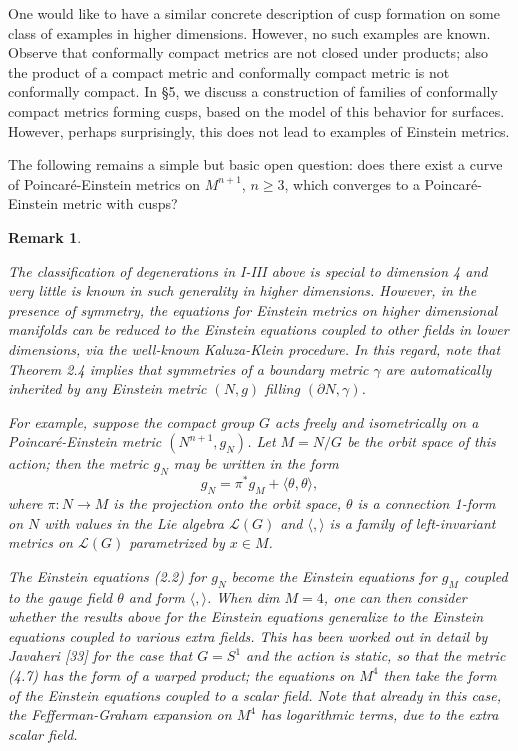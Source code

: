 \documentclass[11pt,amsfonts]{amsart}
\newtheorem{remark}[theorem]{Remark}
\begin{document}
\medskip

 One would like to have a similar concrete description of cusp formation 
on some class of examples in higher dimensions. However, no such examples 
are known. Observe that conformally compact metrics are not closed under 
products; also the product of a compact metric and conformally compact 
metric is not conformally compact. In \S 5, we discuss a construction of 
families of conformally compact metrics forming cusps, based on the model 
of this behavior for surfaces. However, perhaps surprisingly, this does not 
lead to examples of Einstein metrics. 

 The following remains a simple but basic open question: does there 
exist a curve of Poincar\'e-Einstein metrics on $M^{n+1}$, $n \geq 3$, 
which converges to a Poincar\'e-Einstein metric with cusps? 

\begin{remark} \label{r4.4}
{\rm The classification of degenerations in I-III above is special to 
dimension 4 and very little is known in such generality in higher 
dimensions. However, in the presence of symmetry, the equations for 
Einstein metrics on higher dimensional manifolds can be reduced to 
the Einstein equations coupled to other fields in lower dimensions, via 
the well-known Kaluza-Klein procedure. In this regard, note that 
Theorem 2.4  implies that symmetries of a boundary metric $\gamma$ 
are automatically inherited by any Einstein metric $(N, g)$ filling 
$(\partial N, \gamma)$. 

  For example, suppose the compact group $G$ acts freely and isometrically 
on a Poincar\'e-Einstein metric $(N^{n+1}, g_{N})$. Let $M = N / G$ be the 
orbit space of this action; then the metric $g_{N}$ may be written in the 
form 
\begin{equation} \label{e4.7}
g_{N} = \pi^{*}g_{M} + \langle \theta, \theta \rangle,
\end{equation}
where $\pi: N \rightarrow M$ is the projection onto the orbit space, 
$\theta$ is a connection 1-form on $N$ with values in the Lie algebra 
${\mathcal L}(G)$ and $\langle, \rangle$ is a family of left-invariant 
metrics on ${\mathcal L}(G)$ parametrized by $x \in M$. 

   The Einstein equations (2.2) for $g_{N}$ become the Einstein equations 
for $g_{M}$ coupled to the gauge field $\theta$ and form $\langle, \rangle$. 
When dim $M = 4$, one can then consider whether the results above for the 
Einstein equations generalize to the Einstein equations coupled to 
various extra fields. This has been worked out in detail by Javaheri 
[33] for the case that $G = S^{1}$ and the action is static, so that 
the metric (4.7) has the form of a warped product; the equations on $M^{4}$ 
then take the form of the Einstein equations coupled to a scalar field. Note 
that already in this case, the Fefferman-Graham expansion on $M^{4}$ has 
logarithmic terms, due to the extra scalar field. }
\end{remark}
\end{document}

